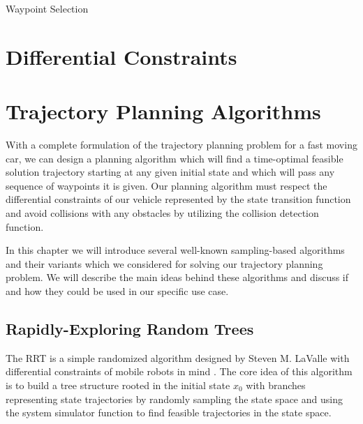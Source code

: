 \vspace{1cm}
\begin{algorithm}[H]
	\caption{Waypoint Selection}
	\label{alg:find_apexes}
	
	\SetAlgoLined
	\DontPrintSemicolon
	
	
\end{algorithm}
\vspace{1cm}


\section{Differential Constraints}
\label{sec:vehicle_model}


\section{Trajectory Planning Algorithms}
\label{sec:trajectory_planning_algorithms}

With a complete formulation of the trajectory planning problem for a fast moving car, we can design a planning algorithm which will find a time-optimal feasible solution trajectory starting at any given initial state and which will pass any sequence of waypoints it is given. Our planning algorithm must respect the differential constraints of our vehicle represented by the state transition function and avoid collisions with any obstacles by utilizing the collision detection function.

In this chapter we will introduce several well-known sampling-based algorithms and their variants which we considered for solving our trajectory planning problem. We will describe the main ideas behind these algorithms and discuss if and how they could be used in our specific use case.

\subsection{Rapidly-Exploring Random Trees}

The \gls{RRT} is a simple randomized algorithm designed by Steven M. LaValle with differential constraints of mobile robots in mind \cite{RRT}. The core idea of this algorithm is to build a tree structure rooted in the initial state $x_0$ with branches representing state trajectories by randomly sampling the state space and using the system simulator function to find feasible trajectories in the state space.

